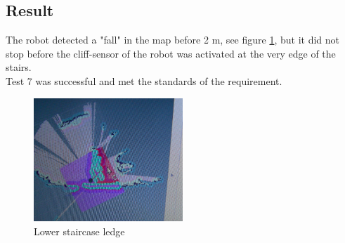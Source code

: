 \subsection{Result}
The robot detected a "fall" in the map before 2 m, see figure \ref{fig:ledge}, but it did not stop before the cliff-sensor of the robot was activated at the very edge of the stairs.\\
Test 7 was successful and met the standards of the requirement.
\begin{figure}[h]
    \centering
    \includegraphics[width=0.5\textwidth]{figures/ledgePicture.png}
    \caption{Lower staircase ledge} 
    \label{fig:ledge} 
\end{figure}